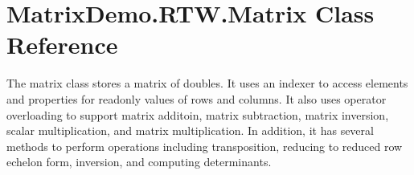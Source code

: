 \hypertarget{class_matrix_demo_1_1_r_t_w_1_1_matrix}{}\section{Matrix\+Demo.\+R\+T\+W.\+Matrix Class Reference}
\label{class_matrix_demo_1_1_r_t_w_1_1_matrix}


The matrix class stores a matrix of doubles. It uses an indexer to access elements and properties for readonly values of rows and columns. It also uses operator overloading to support matrix additoin, matrix subtraction, matrix inversion, scalar multiplication, and matrix multiplication. In addition, it has several methods to perform operations including transposition, reducing to reduced row echelon form, inversion, and computing determinants.  


